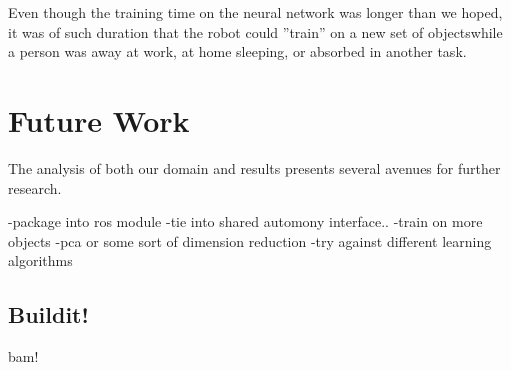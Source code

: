 \documentclass{article}
\begin{document}
Even though the training time on the neural network was longer than we hoped, it was of such duration that the robot could ''train'' on a new set of objectswhile a person was away at work, at home sleeping, or absorbed in another task.

\section{Future Work}
The analysis of both our domain and results presents several avenues for further research.

-package into ros module
-tie into shared automony interface..
-train on more objects
-pca or some sort of dimension reduction
-try against different learning algorithms

\subsection{Buildit!}
bam!



\end{document}
